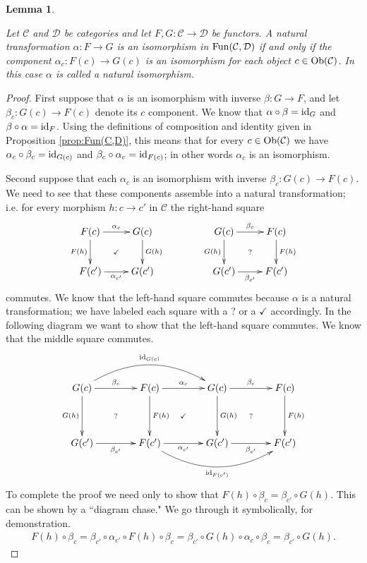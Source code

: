 \documentclass{book}
\def\tn{\textnormal}
\def\mc{\mathcal}
\def\Fun{\tn{Fun}}
\def\Ob{\tn{Ob}}
\def\to{\rightarrow}
\def\taking{\colon}
\def\id{\tn{id}}
\def\mcC{\mc{C}}
\def\mcD{\mc{D}}
\newtheorem{lemma}[subsubsection]{Lemma}
\theoremstyle{remark}
\theoremstyle{definition}
\begin{document}
\begin{lemma}\label{lemma:natural iso}

Let $\mcC$ and $\mcD$ be categories and let $F,G\taking\mcC\to\mcD$ be functors. A natural transformation $\alpha\taking F\to G$ is an isomorphism in $\Fun(\mcC,\mcD)$ if and only if the component $\alpha_c\taking F(c)\to G(c)$ is an isomorphism for each object $c\in\Ob(\mcC)$. In this case $\alpha$ is called a {\em natural isomorphism}.

\end{lemma}

\begin{proof}

First suppose that $\alpha$ is an isomorphism with inverse $\beta\taking G\to F$, and let $\beta_c\taking G(c)\to F(c)$ denote its $c$ component. We know that $\alpha\circ\beta=\id_G$ and $\beta\circ\alpha=\id_F$. Using the definitions of composition and identity given in Proposition \ref{prop:Fun(C,D)}, this means that for every $c\in\Ob(\mcC)$ we have $\alpha_c\circ\beta_c=\id_{G(c)}$ and $\beta_c\circ\alpha_c=\id_{F(c)}$; in other words $\alpha_c$ is an isomorphism.

Second suppose that each $\alpha_c$ is an isomorphism with inverse $\beta_c\taking G(c)\to F(c)$. We need to see that these components assemble into a natural transformation; i.e. for every morphism $h\taking c\to c'$ in $\mcC$ the right-hand square 
$$
\xymatrix{F(c)\ar@{}[dr]|{\checkmark}\ar[d]_{F(h)}\ar[r]^{\alpha_c}&G(c)\ar[d]^{G(h)}\\F(c')\ar[r]_{\alpha_{c'}}&G(c')}\hspace{.5in}
\xymatrix{G(c)\ar@{}[dr]|{?}\ar[d]_{G(h)}\ar[r]^{\beta_c}&F(c)\ar[d]^{F(h)}\\G(c')\ar[r]_{\beta_{c'}}&F(c')}
$$
commutes. We know that the left-hand square commutes because $\alpha$ is a natural transformation; we have labeled each square with a ? or a $\checkmark$ accordingly. In the following diagram we want to show that the left-hand square commutes. We know that the middle square commutes.
$$
\xymatrix@=40pt{G(c)\ar@/^2pc/[rr]^{\id_{G(c)}}\ar@{}[dr]|{?}\ar[d]_{G(h)}\ar[r]^{\beta_c}&F(c)\ar@{}[dr]|{\checkmark}\ar[d]^{F(h)}\ar[r]^{\alpha_c}&G(c)\ar@{}[dr]|{?}\ar[d]^{G(h)}\ar[r]^{\beta_c}&F(c)\ar[d]^{F(h)}\\
G(c')\ar[r]_{\beta_{c'}}&F(c')\ar[r]_{\alpha_{c'}}\ar@/_2pc/[rr]_{\id_{F(c')}}&G(c')\ar[r]_{\beta_{c'}}&F(c')}
$$
To complete the proof we need only to show that $F(h)\circ\beta_c=\beta_{c'}\circ G(h)$. This can be shown by a ``diagram chase." We go through it symbolically, for demonstration.
\begin{align*}
F(h)\circ\beta_c=\beta_{c'}\circ\alpha_{c'}\circ F(h)\circ\beta_c=\beta_{c'}\circ G(h)\circ\alpha_c\circ\beta_c=\beta_{c'}\circ G(h).
\end{align*}

\end{proof}
\end{document}
